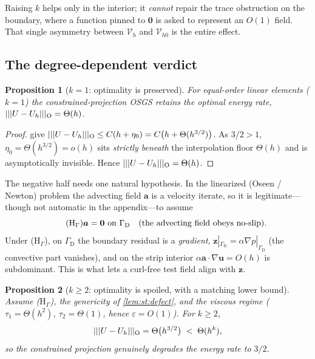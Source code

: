 \documentclass[11pt]{article}
\newcommand{\bu}{\boldsymbol{u}}
\newcommand{\ba}{\boldsymbol{a}}
\newcommand{\bz}{\boldsymbol{z}}
\newcommand{\bzero}{\boldsymbol{0}}
\newcommand{\grad}{\nabla}
\newcommand{\Vh}{\mathcal{V}_{h}}
\newcommand{\Vhz}{\mathcal{V}_{h0}}
\DeclarePairedDelimiter\vvvert{\lvert\lvert\lvert}{\rvert\rvert\rvert}
\newcommand{\tnorm}[1]{\vvvert{#1}}
\theoremstyle{plain}
\newtheorem{proposition}{Proposition}
\theoremstyle{definition}
\theoremstyle{remark}
\begin{document}
Raising $k$ helps only in the interior; it \emph{cannot} repair the trace
obstruction on the boundary, where a function pinned to $\bzero$ is asked to
represent an $O(1)$ field. That single asymmetry between $\Vh$ and $\Vhz$ is
the entire effect.

\subsection{The degree-dependent verdict}

\begin{proposition}[$k=1$: optimality is preserved]\label{prop:st:preserve}
For equal-order linear elements ($k=1$) the constrained-projection
OSGS retains the optimal energy rate,
$\tnorm{U-U_h}_{\mathrm{O}}=\Theta(h)$.
\end{proposition}

\begin{proof}
 give
$\tnorm{U-U_h}_{\mathrm{O}}\le C(h+\eta_0)=C\bigl(h+\Theta(h^{3/2})\bigr)$. As
$3/2>1$, $\eta_0=\Theta(h^{3/2})=o(h)$ sits \emph{strictly beneath} the
interpolation floor $\Theta(h)$ and is asymptotically invisible. Hence
$\tnorm{U-U_h}_{\mathrm{O}}=\Theta(h)$.
\end{proof}

The negative half needs one natural hypothesis. In the linearized (Oseen /
Newton) problem the advecting field $\ba$ is a velocity iterate, so it is
legitimate---though not automatic in the appendix---to assume
\begin{equation*}
  \tag{$\mathrm{H}_\Gamma$}
  \ba=\bzero\ \text{on}\ \Gamma_{\mathrm D}\quad(\text{the advecting field obeys no-slip}).
\end{equation*}
Under ($\mathrm{H}_\Gamma$), on $\Gamma_{\mathrm D}$ the boundary residual is a
\emph{gradient}, $\bz|_{\Gamma_{\mathrm D}}=\alpha\grad p|_{\Gamma_{\mathrm D}}$
(the convective part vanishes), and on the strip interior $\alpha\ba\cdot\grad\bu=O(h)$
is subdominant. This is what lets a curl-free test field align with $\bz$.

\begin{proposition}[$k\ge2$: optimality is spoiled, with a matching lower bound]
\label{prop:st:spoil}
Assume ($\mathrm{H}_\Gamma$), the genericity of \cref{lem:st:defect}, and the
viscous regime ($\tau_1=\Theta(h^2)$, $\tau_2=\Theta(1)$, hence
$\varepsilon=O(1)$). For $k\ge2$,
\begin{equation}\label{eq:st:spoil}
  \tnorm{U-U_h}_{\mathrm{O}}=\Theta\bigl(h^{3/2}\bigr)\;<\;\Theta(h^{k}),
\end{equation}
so the constrained projection genuinely degrades the energy rate to $3/2$.
\end{proposition}
\end{document}
